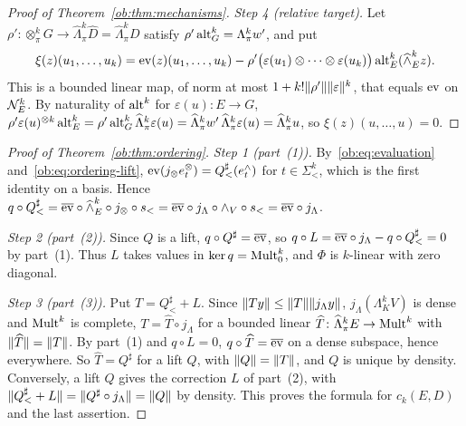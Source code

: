 \begin{proof}[Proof of Theorem~\ref{ob:thm:mechanisms}]
\emph{Step 4 (relative target).} Let $\rho'\colon\otimes^k_\pi G\to\widehat\Lambda^k_\pi\widehat D=\widehat\Lambda^k_\pi D$
satisfy $\rho'\operatorname{alt}^k_G=\Lambda^k_\pi w'$, and put
\[
 \xi(z)(u_1,\dots,u_k)=\operatorname{ev}(z)(u_1,\dots,u_k)-\rho'\bigl(\varepsilon(u_1)\otimes\dots\otimes\varepsilon(u_k)\bigr)
 \operatorname{alt}^k_E(\widehat\wedge^k_Ez).
\]
This is a bounded linear map, of norm at most $1+k!\lVert \rho'\rVert\lVert \varepsilon\rVert^k$, that equals $\operatorname{ev}$ on $\mathcal N^k_E$. By
naturality of $\operatorname{alt}^k$ for $\varepsilon(u)\colon E\to G$,
$\rho'\varepsilon(u)^{\otimes k}\operatorname{alt}^k_E=\rho'\operatorname{alt}^k_G\widehat\Lambda^k_\pi\varepsilon(u)
=\widehat\Lambda^k_\pi w'\,\widehat\Lambda^k_\pi\varepsilon(u)=\widehat\Lambda^k_\pi u$, so $\xi(z)(u,\dots,u)=0$.
\end{proof}

\begin{proof}[Proof of Theorem~\ref{ob:thm:ordering}]
\emph{Step 1 (part~(1)).} By~\eqref{ob:eq:evaluation} and~\eqref{ob:eq:ordering-lift},
$\operatorname{ev}(j_\otimes e^\otimes_t)=Q^\sharp_<(e^\wedge_t)$ for $t\in\Sigma^k_<$, which is the first identity on a basis. Hence
$q\circ Q^\sharp_<=\overline{\operatorname{ev}}\circ\widehat\wedge^k_E\circ j_\otimes\circ s_<=\overline{\operatorname{ev}}\circ j_\Lambda\circ\wedge_V\circ s_<
=\overline{\operatorname{ev}}\circ j_\Lambda$.

\emph{Step 2 (part~(2)).} Since $Q$ is a lift, $q\circ Q^\sharp=\overline{\operatorname{ev}}$, so
$q\circ L=\overline{\operatorname{ev}}\circ j_\Lambda-q\circ Q^\sharp_<=0$ by part~(1). Thus $L$ takes values in $\ker q=\operatorname{Mult}^k_0$, and
$\Phi$ is $k$-linear with zero diagonal.

\emph{Step 3 (part~(3)).} Put $T=Q^\sharp_<+L$. Since $\lVert Ty\rVert\le\lVert T\rVert\lVert j_\Lambda y\rVert$, $j_\Lambda(\Lambda^k_KV)$ is
dense and $\operatorname{Mult}^k$ is complete, $T=\widehat T\circ j_\Lambda$ for a bounded linear $\widehat T\colon\widehat\Lambda^k_\pi E\to\operatorname{Mult}^k$
with $\lVert \widehat T\rVert=\lVert T\rVert$. By part~(1) and $q\circ L=0$, $q\circ\widehat T=\overline{\operatorname{ev}}$ on a dense subspace, hence
everywhere. So $\widehat T=Q^\sharp$ for a lift $Q$, with $\lVert Q\rVert=\lVert T\rVert$, and $Q$ is unique by density. Conversely, a
lift $Q$ gives the correction $L$ of part~(2), with $\lVert Q^\sharp_<+L\rVert=\lVert Q^\sharp\circ j_\Lambda\rVert=\lVert Q\rVert$ by density.
This proves the formula for $c_k(E,D)$ and the last assertion.


\end{proof}
